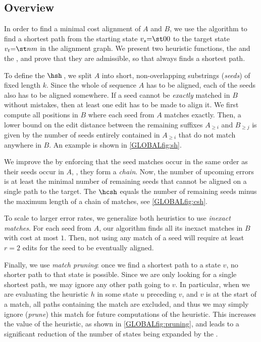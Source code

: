 \subsection{Overview} \label{GLOBALsec:intuition}

In order to find a minimal cost alignment of $A$ and $B$, we use the \A
algorithm to find a shortest path from the starting state $v_s{=}\st 00$ to the
target state $v_t{=}\st nm$ in the alignment graph. We present two heuristic functions,
the \sh and the \csh, and prove that they are admissible, so that \A always finds a
shortest path.

To define the \sh $\hsh$\,, we split $A$ into short, non-overlapping substrings
(\emph{seeds}) of fixed length $k$. Since the whole of sequence $A$ has to be
aligned, each of the seeds also has to be aligned somewhere. If
a seed cannot be \emph{exactly} matched in $B$ without mistakes, then at least
one edit has to be made to align it. We first compute all positions in
$B$ where each seed from $A$ matches exactly. Then, a
lower bound on the edit distance between the remaining suffixes $A_{\geq i}$ and
$B_{\geq j}$ is given by the number of seeds entirely contained in $A_{\geq i}$
that do not match anywhere in $B$. An example is shown in \cref{GLOBALfig:sh}.

We improve the \sh by enforcing that the seed matches occur in the same order as
their seeds occur in $A$, \ie, they form a \emph{chain}. Now, the number of upcoming
errors is at least the minimal number of remaining seeds that cannot be aligned
on a single path to the target. The \csh $\hcsh$ equals the number of remaining
seeds minus the maximum length of a chain of matches, see \cref{GLOBALfig:csh}.

To scale to larger error rates, we generalize both heuristics to use
\emph{inexact matches}. For each seed from $A$, our algorithm finds all its
inexact matches in $B$ with cost at most $1$. Then, not using any match of a
seed will require at least $r{=}2$ edits for the seed to be eventually aligned.

Finally, we use \emph{match pruning}: once we find a shortest path to a state
$v$, no shorter path to that state is possible. Since we are only looking for a
single shortest path, we may ignore any other path going to $v$. In particular,
when we are evaluating the heuristic $h$ in some state $u$ preceding $v$, and
$v$ is at the start of a match, all paths containing the match are excluded, and
thus we may simply ignore (\emph{prune}) this match for future computations of
the heuristic. This increases the value of the heuristic, as shown in \cref{GLOBALfig:pruning}, and leads to a
significant reduction of the number of states being expanded by the \A.
